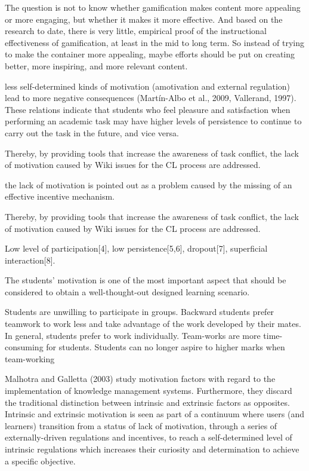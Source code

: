 The question is not to know whether gamification makes content more appealing or more engaging, but whether it makes it more effective. And based on the research to date, there is very little, empirical proof of the instructional effectiveness of gamification, at least in the mid to long term. So instead of trying to make the container more appealing, maybe efforts should be put on creating better, more inspiring, and more relevant content.






less self-determined kinds of motivation (amotivation and external regulation) lead to more negative consequences (Martín-Albo et al., 2009, Vallerand, 1997). These relations indicate that students who feel pleasure and satisfaction when performing an academic task may have higher levels of persistence to continue to carry out the task in the future, and vice versa.






 Thereby, by providing tools that increase the awareness of task conflict, the lack of motivation caused by Wiki issues for the CL process are addressed.


the lack of motivation is pointed out as a problem caused by the missing of an effective incentive mechanism.


Thereby, by providing tools that increase the awareness of task conflict, the lack of motivation caused by Wiki issues for the CL process are addressed.



Low level of participation[4], low persistence[5,6], dropout[7], superficial interaction[8].



The students' motivation is one of the most important aspect that should be considered to obtain a well-thought-out designed learning scenario.



Students are unwilling to participate in groups.
Backward students prefer teamwork to work less and take advantage of the work developed by their mates.
In general, students prefer to work individually.
Team-works are more time-consuming for students.
Students can no longer aspire to higher marks when team-working




Malhotra and Galletta (2003) study motivation factors with regard to the implementation of knowledge management systems. Furthermore, they discard the traditional distinction between intrinsic and extrinsic factors as opposites. Intrinsic and extrinsic motivation is seen as part of a continuum where users (and learners) transition from a status of lack of motivation, through a series of externally-driven regulations and incentives, to reach a self-determined level of intrinsic regulations which increases their curiosity and determination to achieve a specific objective.

